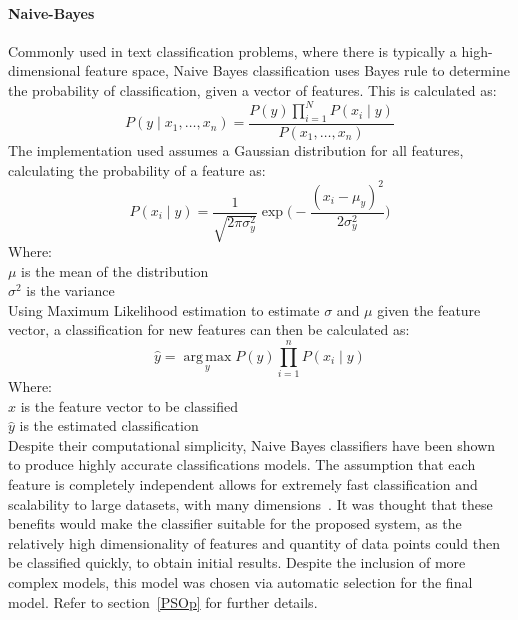\documentclass[titlepage, 12pt]{scrartcl} \usepackage{enumitem}
\DeclareMathOperator*{\argmax}{arg\,max}
\begin{document}
\paragraph{Naive-Bayes}
Commonly used in text classification problems, where there is typically a
high-dimensional feature space, Naive Bayes classification uses Bayes rule to
determine the probability of classification, given a vector of features. This
is calculated as:
\begin{equation}
    P(y\mid x_1,\ldots,x_n)=\frac{P(y)\prod\limits_{i=1}^{N}P(x_i\mid y)}{P(x_1,\ldots,x_n)}
\end{equation}
The implementation used assumes a Gaussian distribution for all features,
calculating the probability of a feature as:
\begin{equation}
    P(x_i\mid y)=\frac{1}{\sqrt{2\pi
    \sigma_y^2}}\exp\bigg(-\frac{(x_i-\mu_y)^2}{2\sigma^2_y}\bigg)
\end{equation}
Where:\\
$\mu$ is the mean of the distribution\\
$\sigma^2$ is the variance\\
Using Maximum Likelihood estimation to estimate $\sigma$ and $\mu$ given the
feature vector, a classification for new features can then be calculated as:
\begin{equation}
    \hat{y}=\argmax\limits_y P(y)\prod\limits_{i=1}^nP(x_i\mid y)
\end{equation}
Where:\\
$x$ is the feature vector to be classified\\
$\hat{y}$ is the estimated classification\\

Despite their computational simplicity, Naive Bayes classifiers have been shown
to produce highly accurate classifications models. The assumption that each feature is
completely independent allows for extremely fast classification and scalability
to large datasets, with many dimensions~\parencite[p.300]{Zhang2004}. It was
thought that these benefits would make the classifier suitable for the proposed system, as the relatively high
dimensionality of features and quantity of data points could then be classified
quickly, to obtain initial results. Despite the inclusion of more complex
models, this model was chosen via automatic selection for the final model.
Refer to section~\ref{PSOp} for further details.
\end{document}
